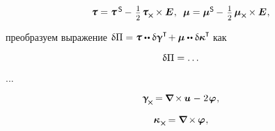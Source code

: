 \begin{otherlanguage}{russian}
\begin{equation*}
\begin{array}{c}
%
\forcestresstensor = \forcestresstensor^{\hspace{.32ex}\mathsf{S}} \hspace{-0.1ex} - \hspace{.25ex} \smalldisplaystyleonehalf \hspace{.2ex} \forcestresstensor_{\hspace{-0.1ex}\Xcompanion} \hspace{-0.1ex} \times \UnitDyad
\hspace{.1ex} ,
\;\:
%
\couplestresstensor = \couplestresstensor^{\mathsf{S}} \hspace{-0.1ex} - \hspace{.25ex} \smalldisplaystyleonehalf \hspace{.32ex} \couplestresstensor_{\Xcompanion} \hspace{-0.1ex} \times \UnitDyad
\hspace{.1ex} ,
\end{array}
\end{equation*}

\noindent
преобразуем выражение
${\variation{\potentialenergydensity} = \forcestresstensor \dotdotp \variation{\distortiontensor}^{\T} \hspace{-0.3ex}
+ \couplestresstensor \dotdotp \variation{\wrynesstensor}^{\T} \hspace{-0.25ex}}$
как

\nopagebreak\vspace{-0.1em}\begin{equation}
\updelta\hspace{-0.1ex}\Pi = \ldots
\end{equation}

...

\begin{equation*}
\distortiontensor_{\hspace{-0.25ex}\Xcompanion} \hspace{-0.16ex}
= \hspace{-0.1ex} \boldnabla \hspace{-0.16ex} \times \hspace{-0.1ex} \fieldofdisplacements \hspace{.12ex} - \hspace{.12ex} 2 \hspace{.16ex} \fieldofrotations
\hspace{.1ex} ,
\end{equation*}

\begin{equation*}
\wrynesstensor_{\hspace{.15ex}\Xcompanion} \hspace{-0.16ex}
= \boldnabla \hspace{-0.16ex} \times \hspace{-0.1ex} \fieldofrotations
\hspace{.1ex} ,
\end{equation*}


\end{otherlanguage}
